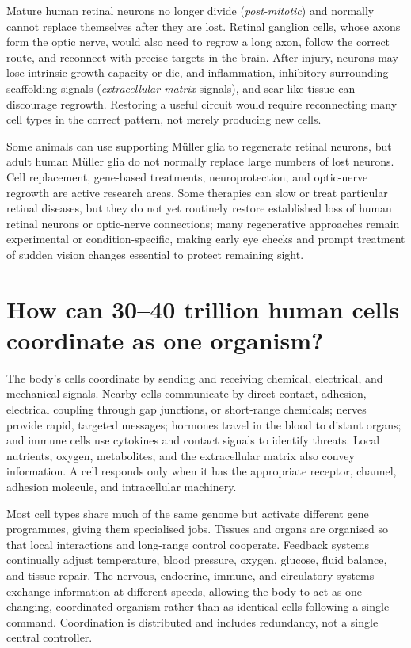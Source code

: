 \documentclass[11pt,oneside]{report}
\begin{document}
Mature human retinal neurons no longer divide (\emph{post-mitotic}) and normally
cannot replace themselves after they are lost. Retinal ganglion cells, whose
axons form the optic nerve, would also need to regrow a long axon, follow the
correct route, and reconnect with precise targets in the brain. After injury,
neurons may lose intrinsic growth capacity or die, and inflammation, inhibitory
surrounding scaffolding signals (\emph{extracellular-matrix} signals), and
scar-like tissue can discourage regrowth.
Restoring a useful circuit would require reconnecting many cell types in the
correct pattern, not merely producing new cells.

Some animals can use supporting Müller glia to regenerate retinal neurons, but
adult human Müller glia do not normally replace large numbers of lost neurons.
Cell replacement, gene-based treatments, neuroprotection, and optic-nerve
regrowth are active research areas. Some therapies can slow or treat particular
retinal diseases, but they do not yet routinely restore established loss of
human retinal neurons or optic-nerve connections; many regenerative approaches
remain experimental or condition-specific, making early eye checks and prompt
treatment of sudden vision changes essential to protect remaining sight.

\section{How can 30--40 trillion human cells coordinate as one organism?}

The body's cells coordinate by sending and receiving chemical, electrical, and
mechanical signals. Nearby cells communicate by direct contact, adhesion,
electrical coupling through gap junctions, or short-range chemicals; nerves
provide rapid, targeted messages; hormones travel in the blood to distant
organs; and immune cells use cytokines and contact signals to identify threats.
Local nutrients, oxygen, metabolites, and the extracellular matrix also convey
information. A cell responds only when it has the appropriate receptor,
channel, adhesion molecule, and intracellular machinery.

Most cell types share much of the same genome but activate different gene
programmes, giving them specialised jobs. Tissues and organs are organised so
that local interactions and long-range control cooperate. Feedback systems
continually adjust temperature, blood pressure, oxygen, glucose, fluid balance,
and tissue repair. The nervous, endocrine, immune, and circulatory systems
exchange information at different speeds, allowing the body to act as one
changing, coordinated organism rather than as identical cells following a
single command. Coordination is distributed and includes redundancy, not a
single central controller.
\end{document}
